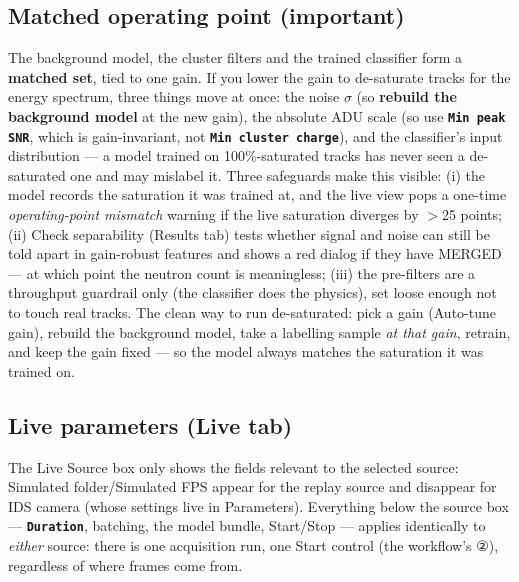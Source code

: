 \documentclass[11pt,a4paper]{article}
\newcommand{\param}[1]{\texttt{\textbf{#1}}}
\newcommand{\gui}[1]{\textsf{#1}}
\begin{document}
\subsection{Matched operating point (important)}
The background model, the cluster filters and the trained classifier form a
\textbf{matched set}, tied to one gain. If you lower the gain to de-saturate
tracks for the energy spectrum, three things move at once: the noise $\sigma$
(so \textbf{rebuild the background model} at the new gain), the absolute ADU
scale (so use \param{Min peak SNR}, which is gain-invariant, not
\param{Min cluster charge}), and the classifier's input distribution --- a
model trained on 100\%-saturated tracks has never seen a de-saturated one and
may mislabel it. Three safeguards make this visible: (i) the model records
the saturation it was trained at, and the live view pops a one-time
\emph{operating-point mismatch} warning if the live saturation diverges by
$>$25 points; (ii) \gui{Check separability} (Results tab) tests whether signal
and noise can still be told apart in gain-robust features and shows a red
dialog if they have MERGED --- at which point the neutron count is
meaningless; (iii) the pre-filters are a throughput guardrail only (the
classifier does the physics), set loose enough not to touch real tracks.
The clean way to run de-saturated: pick a gain (\gui{Auto-tune gain}), rebuild
the background model, take a labelling sample \emph{at that gain}, retrain,
and keep the gain fixed --- so the model always matches the saturation it was
trained on.

\subsection{Live parameters (Live tab)}\label{sec:live}
The \gui{Live Source} box only shows the fields relevant to the selected
source: \gui{Simulated folder}/\gui{Simulated FPS} appear for the replay
source and disappear for \gui{IDS camera} (whose settings live in
\gui{Parameters}). Everything below the source box --- \param{Duration},
batching, the model bundle, \gui{Start}/\gui{Stop} --- applies identically
to \emph{either} source: there is one acquisition run, one Start control
(the workflow's ②), regardless of where frames come from.
\end{document}
